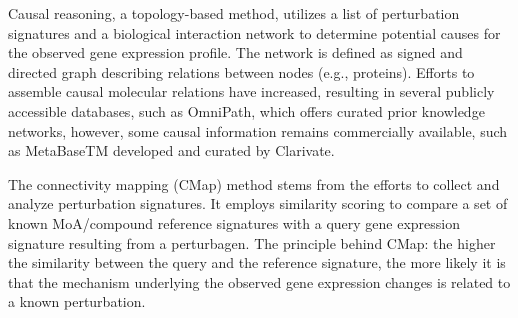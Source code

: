 Causal reasoning, a topology-based method, utilizes a list of perturbation signatures and a biological interaction network to determine potential causes for the observed gene expression profile. The network is defined as signed and directed graph describing relations between nodes (e.g., proteins). Efforts to assemble causal molecular relations have increased, resulting in several publicly accessible databases, such as OmniPath, which offers curated prior knowledge networks, however, some causal information remains commercially available, such as MetaBaseTM developed and curated by Clarivate.

The connectivity mapping (CMap) method stems from the efforts to collect and analyze perturbation signatures. It employs similarity scoring to compare a set of known MoA/compound reference signatures with a query gene expression signature resulting from a perturbagen. The principle behind CMap: the higher the similarity between the query and the reference signature, the more likely it is that the mechanism underlying the observed gene expression changes is related to a known perturbation.

